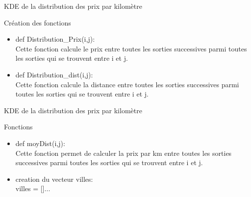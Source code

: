\documentclass[aspectratio=169]{beamer}
\begin{document}
\begin{frame}{KDE de la distribution des prix par kilomètre}
\begin{block}{Création des fonctions}
\begin{itemize}
\item def Distribution\_Prix(i,j):\\[2 mm]
Cette fonction calcule le prix entre toutes les sorties successives parmi toutes les sorties qui se trouvent entre i et j. \\[2 mm]
\item def Distribution\_dist(i,j):\\[2 mm]
Cette fonction calcule la distance entre toutes les sorties successives parmi toutes les sorties qui se trouvent entre i et j. \\[2 mm]
\end{itemize}
\end{block}
\end{frame}
\begin{frame}{KDE de la distribution des prix par kilomètre}
\begin{block}{Fonctions}
 \begin{itemize}

\item def moyDist(i,j):\\[2 mm]
Cette fonction permet de calculer la prix par km entre toutes les sorties successives parmi toutes les sorties qui se trouvent entre i et j.\\[2 mm]
\item creation du vecteur villes:\\
villes = []...\\
\end{itemize}
\end{block} 

\end{frame}
\end{document}
